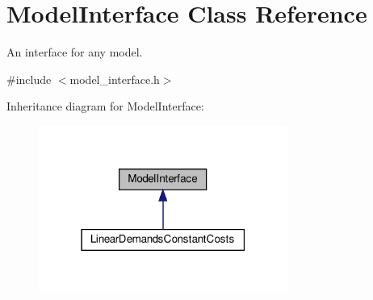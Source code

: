 \hypertarget{classModelInterface}{}\section{Model\+Interface Class Reference}
\label{classModelInterface}


An interface for any model.  




{\ttfamily \#include $<$model\+\_\+interface.\+h$>$}



Inheritance diagram for Model\+Interface\+:\nopagebreak
\begin{figure}[H]
\begin{center}
\leavevmode
\includegraphics[width=231pt]{classModelInterface__inherit__graph}
\end{center}
\end{figure}

